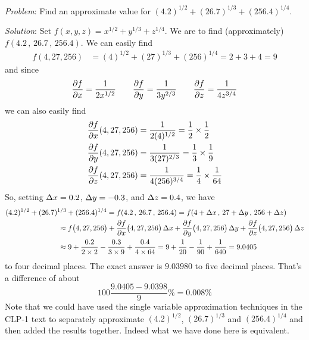 \begin{eg}\label{eg approx B}
\noindent\textit{Problem}:
Find an approximate value for $(4.2)^{1/2} + (26.7)^{1/3} + (256.4)^{1/4}$.

\medskip
\noindent\textit{Solution}:
Set $f(x,y,z) = x^{1/2} + y^{1/3} + z^{1/4}$. We are to find (approximately) 
$f(4.2\,,\,26.7\,,\,256.4)$. We can easily find
\begin{align*}
f(4,27,256) &= (4)^{1/2} + (27)^{1/3} + (256)^{1/4} = 2+3+4 =9
\end{align*}
and since 
\begin{equation*}
\pdiff{f}{x}=\frac{1}{2x^{1/2}}\qquad
\pdiff{f}{y}=\frac{1}{3y^{2/3}}\qquad
\pdiff{f}{z}=\frac{1}{4z^{3/4}}
\end{equation*}
we can also easily find
\begin{align*}
\pdiff{f}{x}(4,27,256) &= \frac{1}{2(4)^{1/2}} =\frac{1}{2}\times\frac{1}{2} \\
\pdiff{f}{y}(4,27,256) &= \frac{1}{3(27)^{2/3}}=\frac{1}{3}\times\frac{1}{9} \\
\pdiff{f}{z}(4,27,256) &= \frac{1}{4(256)^{3/4}}=\frac{1}{4}\times\frac{1}{64}
\end{align*}
So, setting $\Delta x=0.2$, $\Delta y=-0.3$, and $\Delta z=0.4$, we have
\begin{align*}
&(4.2)^{1/2} + (26.7)^{1/3} + (256.4)^{1/4}
=f(4.2\,,\,26.7\,,\,256.4)
=f(4+\De x\,,\,27+\De y\,,\,256+\De z) \\
&\hskip1in\approx f\big(4,27,256\big) 
       + \pdiff{f}{x}\big(4,27,256\big)\,\De x
       + \pdiff{f}{y}\big(4,27,256\big)\,\De y 
       + \pdiff{f}{z}\big(4,27,256\big)\,\De z \\
&\hskip1in\approx 9 +\frac{0.2}{2\times2}-\frac{0.3}{3\times9}
            +\frac{0.4}{4\times64}
 = 9+\frac{1}{20}-\frac{1}{90}+\frac{1}{640}
=9.0405
\end{align*}
to four decimal places.
The exact answer is $9.03980$ to five decimal places.
That's a difference of about
\begin{equation*}
100\frac{9.0405-9.0398}{9}\%
=0.008\%
\end{equation*}
Note that we could have used the single variable approximation techniques
in the CLP-1 text to separately approximate 
$(4.2)^{1/2}$, $(26.7)^{1/3}$  and $(256.4)^{1/4}$ and then added 
the results together. Indeed what we have done here is equivalent.
\end{eg}

